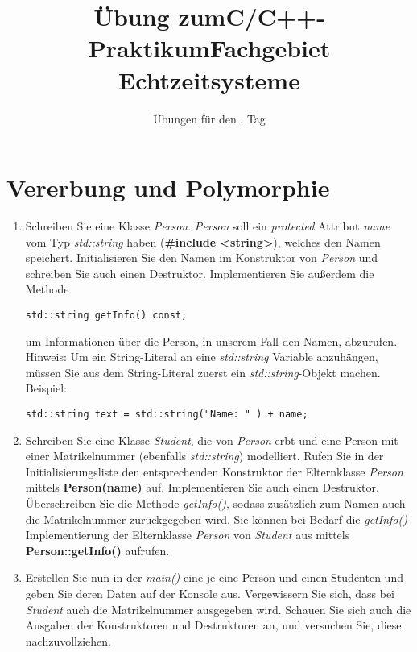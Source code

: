 \documentclass[
  accentcolor=tud1c,	%
  colorbacktitle,		%
  inverttitle,			%
  german,				%
  twoside
]{tudexercise}
\title{Übung zum\linebreak[1]C/C++-Praktikum\linebreak[1] Fachgebiet Echtzeitsysteme}
\subtitle{Übungen für den \tag{}. Tag}
\newcommand{\tag}{3}
\begin{document}
\begin{examheader}
	\textmb{Übung zum C/C++-Praktikum - Tag \tag{}}
\end{examheader}
\maketitle 

\vspace{5mm}

\section{Vererbung und Polymorphie}
\begin{enumerate}
\item Schreiben Sie eine Klasse \emph{Person}. \emph{Person} soll ein \emph{protected} Attribut \emph{name} vom Typ \emph{std::string} haben (\textbf{\#include <string>}), welches den Namen speichert. Initialisieren Sie den Namen im Konstruktor von \emph{Person} und schreiben Sie auch einen Destruktor. Implementieren Sie außerdem die Methode 
\begin{lstlisting}
std::string getInfo() const;
\end{lstlisting}

um Informationen über die Person, in unserem Fall den Namen, abzurufen. Hinweis: Um ein String-Literal an eine \emph{std::string} Variable anzuhängen, müssen Sie aus dem String-Literal zuerst ein \emph{std::string}-Objekt machen. Beispiel:
\begin{lstlisting}
std::string text = std::string("Name: " ) + name;
\end{lstlisting}

\item Schreiben Sie eine Klasse \emph{Student}, die von \emph{Person} erbt und eine Person mit einer Matrikelnummer (ebenfalls \emph{std::string}) modelliert. Rufen Sie in der Initialisierungsliste den entsprechenden Konstruktor der Elternklasse \emph{Person} mittels \textbf{Person(name)} auf. Implementieren Sie auch einen Destruktor. \\

Überschreiben Sie die Methode \emph{getInfo()}, sodass zusätzlich zum Namen auch die Matrikelnummer zurückgegeben wird. Sie können bei Bedarf die \emph{getInfo()}-Implementierung der Elternklasse \emph{Person} von \emph{Student} aus mittels \textbf{Person::getInfo()} aufrufen.

\item Erstellen Sie nun in der \emph{main()} eine je eine Person und einen Studenten und geben Sie deren Daten auf der Konsole aus. Vergewissern Sie sich, dass bei \emph{Student} auch die Matrikelnummer ausgegeben wird. Schauen Sie sich auch die Ausgaben der Konstruktoren und Destruktoren an, und versuchen Sie, diese nachzuvollziehen.


\end{enumerate}
\end{document}
